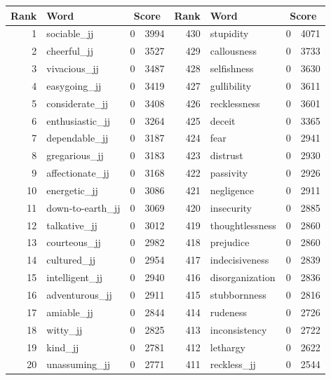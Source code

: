 \begin{table}[tbp]
    \begin{tabular}{| rlr@{.}l | rlr@{.}l |}
    \hline
    \textbf{Rank} & \textbf{Word} & \multicolumn{2}{c|}{\textbf{Score}} & \textbf{Rank} & \textbf{Word} & \multicolumn{2}{c|}{\textbf{Score}} \\
    \hline
    1 & sociable\_jj & 0 & 3994    &    430 & stupidity & 0 & 4071 \\
    2 & cheerful\_jj & 0 & 3527    &    429 & callousness & 0 & 3733 \\
    3 & vivacious\_jj & 0 & 3487    &    428 & selfishness & 0 & 3630 \\
    4 & easygoing\_jj & 0 & 3419    &    427 & gullibility & 0 & 3611 \\
    5 & considerate\_jj & 0 & 3408    &    426 & recklessness & 0 & 3601 \\
    6 & enthusiastic\_jj & 0 & 3264    &    425 & deceit & 0 & 3365 \\
    7 & dependable\_jj & 0 & 3187    &    424 & fear & 0 & 2941 \\
    8 & gregarious\_jj & 0 & 3183    &    423 & distrust & 0 & 2930 \\
    9 & affectionate\_jj & 0 & 3168    &    422 & passivity & 0 & 2926 \\
    10 & energetic\_jj & 0 & 3086    &    421 & negligence & 0 & 2911 \\
    11 & down-to-earth\_jj & 0 & 3069    &    420 & insecurity & 0 & 2885 \\
    12 & talkative\_jj & 0 & 3012    &    419 & thoughtlessness & 0 & 2860 \\
    13 & courteous\_jj & 0 & 2982    &    418 & prejudice & 0 & 2860 \\
    14 & cultured\_jj & 0 & 2954    &    417 & indecisiveness & 0 & 2839 \\
    15 & intelligent\_jj & 0 & 2940    &    416 & disorganization & 0 & 2836 \\
    16 & adventurous\_jj & 0 & 2911    &    415 & stubbornness & 0 & 2816 \\
    17 & amiable\_jj & 0 & 2844    &    414 & rudeness & 0 & 2726 \\
    18 & witty\_jj & 0 & 2825    &    413 & inconsistency & 0 & 2722 \\
    19 & kind\_jj & 0 & 2781    &    412 & lethargy & 0 & 2622 \\
    20 & unassuming\_jj & 0 & 2771    &    411 & reckless\_jj & 0 & 2544 \\

\end{tabular}
\end{table}
